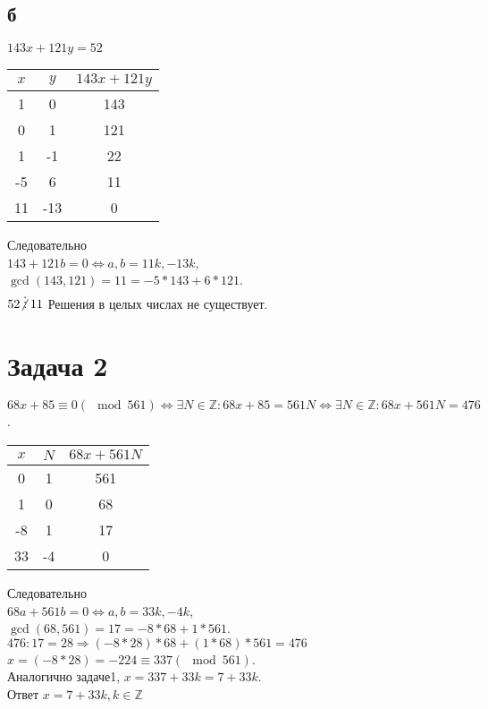 \documentclass[12pt]{exam}
\begin{document}
\subsection*{б}
$143x + 121y = 52$
\begin{center}
\begin{tabular}{c | c | c}
    $x$ & $y$ & $143 x + 121 y$ \\
    \hline 
    1 & 0 & 143 \\
    0 & 1 & 121 \\
    1 & -1 & 22 \\
    -5 & 6 & 11 \\
    11 & -13 & 0 
    
\end{tabular}
\end{center}
Следовательно \\
$143 + 121b = 0 \Leftrightarrow a, b = 11k, -13k$, \\
$\gcd (143, 121) = 11 = -5 * 143 + 6 * 121$.\\
$ 52 \centernot\vdots 11$ Решения в целых числах не существует. 

\section*{Задача 2}
$68x + 85 \equiv 0 (\mod 561) \Leftrightarrow 
\exists N \in \mathbb{Z}: 68x + 85 = 561N \Leftrightarrow 
\exists N \in \mathbb{Z}: 68x + 561N = 476$. \\

\begin{center}
    \begin{tabular}{c | c | c}
        $x$ & $N$ & $68 x + 561 N$ \\
        \hline 
        0 & 1 & 561 \\ 
        1 & 0 & 68 \\ 
        -8 & 1 & 17 \\
        33 & -4 & 0 
        
    \end{tabular}
\end{center}
Следовательно \\
$68 a + 561 b = 0 \Leftrightarrow a, b = 33k, -4k$,\\
$\gcd(68, 561) = 17 = -8 * 68 + 1 * 561$.\\
$476 : 17 = 28 \Rightarrow (-8 * 28) * 68 + (1 * 68) * 561 = 476$\\
$x = (-8 * 28) = -224 \equiv 337 (\mod 561)$. \\
Аналогично задаче1, $x = 337 + 33k = 7 + 33k$.\\
Ответ $x = 7 + 33k, k \in \mathbb{Z}$
\end{document}
